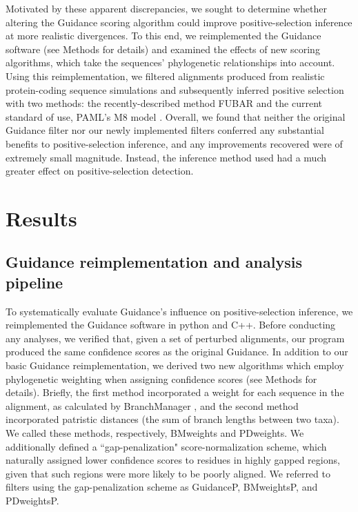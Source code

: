 \documentclass[10pt]{article}
\begin{document}
Motivated by these apparent discrepancies, we sought to determine whether altering the Guidance scoring algorithm could improve positive-selection inference at more realistic divergences. To this end, we reimplemented the Guidance software (see Methods for details) and examined the effects of new scoring algorithms, which take the sequences' phylogenetic relationships into account. Using this reimplementation, we filtered alignments produced from realistic protein-coding sequence simulations and subsequently inferred positive selection with two methods: the recently-described method FUBAR \citep{Murrell2013} and the current standard of use, PAML's M8 model \citep{Yang2007}. Overall, we found that neither the original Guidance filter nor our newly implemented filters conferred any substantial benefits to positive-selection inference, and any improvements recovered were of extremely small magnitude. Instead, the inference method used had a much greater effect on positive-selection detection.


\section*{Results}

\subsection*{Guidance reimplementation and analysis pipeline}
To systematically evaluate Guidance's influence on positive-selection inference, we reimplemented the Guidance software in python and C++. Before conducting any analyses, we verified that, given a set of perturbed alignments, our program produced the same confidence scores as the original Guidance. In addition to our basic Guidance reimplementation, we derived two new algorithms which employ phylogenetic weighting when assigning confidence scores (see Methods for details).  Briefly, the first method incorporated a weight for each sequence in the alignment, as calculated by BranchManager \citep{Stone2007}, and the second method incorporated patristic distances (the sum of branch lengths between two taxa). We called these methods, respectively, BMweights and PDweights.  We additionally defined a ``gap-penalization" score-normalization scheme, which naturally assigned lower confidence scores to residues in highly gapped regions, given that such regions were more likely to be poorly aligned. We referred to filters using the gap-penalization scheme as GuidanceP, BMweightsP, and PDweightsP.
\end{document}
